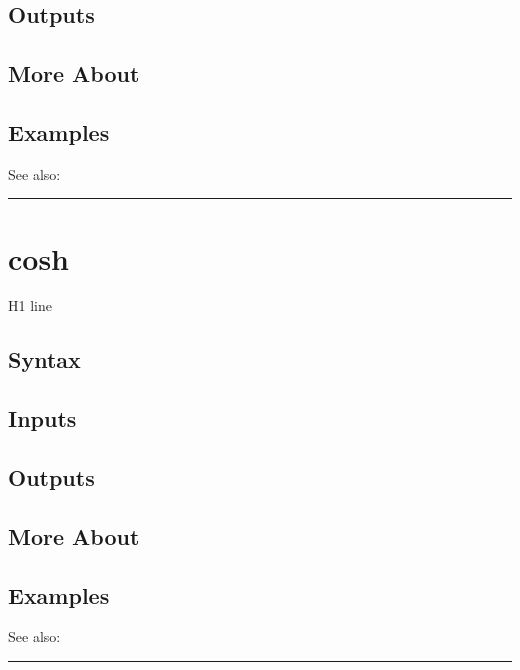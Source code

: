 \documentclass[letterpaper,10pt,english]{sphinxmanual}
\begin{document}
\subsection{Outputs}
\label{classes/time_series/@ts/ts:id128}

\subsection{More About}
\label{classes/time_series/@ts/ts:id129}

\subsection{Examples}
\label{classes/time_series/@ts/ts:id130}
See also:


\bigskip\hrule{}\bigskip



\section{cosh}
\label{classes/time_series/@ts/ts:id131}\label{classes/time_series/@ts/ts:cosh}
H1 line


\subsection{Syntax}
\label{classes/time_series/@ts/ts:id132}

\subsection{Inputs}
\label{classes/time_series/@ts/ts:id133}

\subsection{Outputs}
\label{classes/time_series/@ts/ts:id134}

\subsection{More About}
\label{classes/time_series/@ts/ts:id135}

\subsection{Examples}
\label{classes/time_series/@ts/ts:id136}
See also:


\bigskip\hrule{}\bigskip
\end{document}
